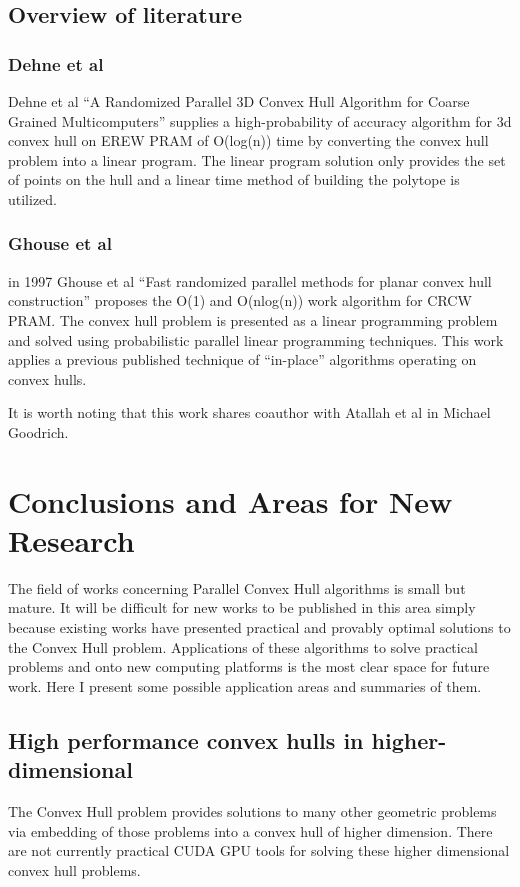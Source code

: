 \documentclass[10pt,a4paper]{report}
\begin{document}
\subsection{Overview of literature}



\subsubsection{Dehne et al}
Dehne et al ``A Randomized Parallel 3D Convex Hull Algorithm for Coarse Grained Multicomputers''\cite{Dehne} supplies a high-probability of accuracy algorithm for 3d convex hull on EREW PRAM of O(log(n)) time by converting the convex hull problem into a linear program. The linear program solution only provides the set of points on the hull and a linear time method of building the polytope is utilized.

\subsubsection{Ghouse et al}

in 1997 Ghouse et al ``Fast randomized parallel methods for planar convex hull construction'' \cite{Mujtaba1997Fast} proposes the O(1) and O(nlog(n)) work algorithm for CRCW PRAM. The convex hull problem is presented as a linear programming problem and solved using probabilistic parallel linear programming techniques.
This work applies a previous published technique of ``in-place''\cite{ghouse1991place} algorithms operating on convex hulls.


It is worth noting that this work shares coauthor with Atallah et al in Michael Goodrich.



\section{Conclusions and Areas for New Research}

The field of works concerning Parallel Convex Hull algorithms is small but mature.
It will be difficult for new works to be published in this area simply because existing works have presented practical and provably optimal solutions to the Convex Hull problem.
Applications of these algorithms to solve practical problems and onto new computing platforms is the most clear space for future work.
Here I present some possible application areas and summaries of them.

\subsection{High performance convex hulls in higher-dimensional}
The Convex Hull problem provides solutions to many other geometric problems via embedding of those problems into a convex hull of higher dimension. There are not currently practical CUDA GPU tools for solving these higher dimensional convex hull problems.
\end{document}
